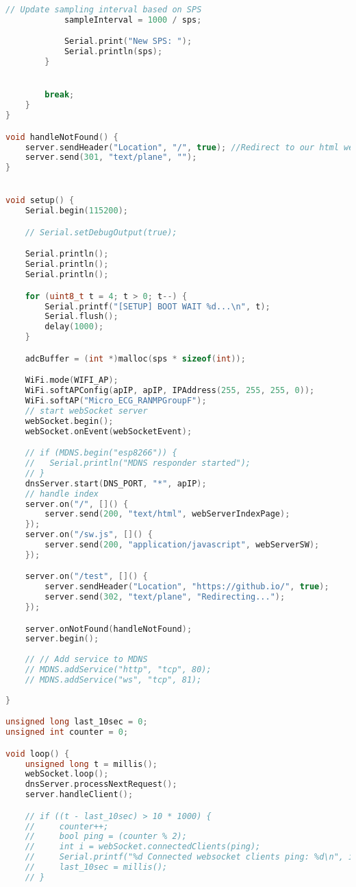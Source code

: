 \begin{lstlisting}[style=htmlcssjs, language=CPP]
            // Update sampling interval based on SPS
            sampleInterval = 1000 / sps;

            Serial.print("New SPS: ");
            Serial.println(sps);
        }


        break;
    }
}

void handleNotFound() {
    server.sendHeader("Location", "/", true); //Redirect to our html web page
    server.send(301, "text/plane", "");
}


void setup() {
    Serial.begin(115200);

    // Serial.setDebugOutput(true);

    Serial.println();
    Serial.println();
    Serial.println();

    for (uint8_t t = 4; t > 0; t--) {
        Serial.printf("[SETUP] BOOT WAIT %d...\n", t);
        Serial.flush();
        delay(1000);
    }

    adcBuffer = (int *)malloc(sps * sizeof(int));

    WiFi.mode(WIFI_AP);
    WiFi.softAPConfig(apIP, apIP, IPAddress(255, 255, 255, 0));
    WiFi.softAP("Micro_ECG_RANMPGroupF");
    // start webSocket server
    webSocket.begin();
    webSocket.onEvent(webSocketEvent);

    // if (MDNS.begin("esp8266")) {
    //   Serial.println("MDNS responder started");
    // }
    dnsServer.start(DNS_PORT, "*", apIP);
    // handle index
    server.on("/", []() {
        server.send(200, "text/html", webServerIndexPage);
    });
    server.on("/sw.js", []() {
        server.send(200, "application/javascript", webServerSW);
    });

    server.on("/test", []() {
        server.sendHeader("Location", "https://github.io/", true);
        server.send(302, "text/plane", "Redirecting...");
    });

    server.onNotFound(handleNotFound);
    server.begin();
    
    // // Add service to MDNS
    // MDNS.addService("http", "tcp", 80);
    // MDNS.addService("ws", "tcp", 81);
    
}

unsigned long last_10sec = 0;
unsigned int counter = 0;

void loop() {
    unsigned long t = millis();
    webSocket.loop();
    dnsServer.processNextRequest();
    server.handleClient();

    // if ((t - last_10sec) > 10 * 1000) {
    //     counter++;
    //     bool ping = (counter % 2);
    //     int i = webSocket.connectedClients(ping);
    //     Serial.printf("%d Connected websocket clients ping: %d\n", i, ping);
    //     last_10sec = millis();
    // }


\end{lstlisting}
